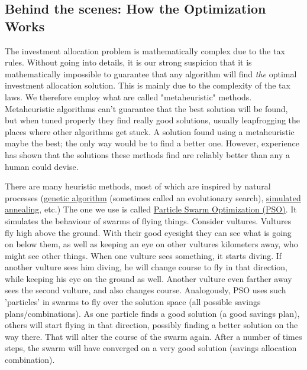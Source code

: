 \documentclass[a4paper, justified]{tufte-handout}
\begin{document}
\subsection{Behind  the scenes: How the Optimization Works}

The investment allocation problem is mathematically complex due to the tax rules. Without going into details, it is our strong suspicion that it is mathematically impossible to guarantee that any algorithm will find \textit{the} optimal investment allocation solution. This is mainly due to the complexity of the tax laws. We therefore employ what are called "metaheuristic" methods. Metaheuristic algorithms can't guarantee that the best solution will be found, but when tuned properly they find really good solutions, usually leapfrogging the places where other algorithms get stuck. A solution found using a metaheuristic maybe the best; the only way would be to find a better one. However, experience has shown that the solutions these methods find are reliably better than any a human could devise.

There are many heuristic methods, most of which are inspired by natural processes (\href{https://en.wikipedia.org/wiki/Genetic_algorithm}{genetic algorithm} (sometimes called an evolutionary search), \href{https://en.wikipedia.org/wiki/Simulated_annealing}{simulated annealing}, etc.) The one we use is called \href{https://en.wikipedia.org/wiki/Particle_swarm_optimization}{Particle Swarm Optimization (PSO)}. It simulates the behaviour of swarms of flying things. Consider vultures. Vultures fly high above the ground. With their good eyesight they can see what is going on below them, as well as keeping an eye on other vultures kilometers away, who might see other things. When one vulture sees something, it starts diving. If another vulture sees him diving, he will change course to fly in that direction, while keeping his eye on the ground as well. Another vulture even farther away sees the second vulture, and also changes course. Analogously, PSO uses such 'particles' in swarms to fly over the solution space (all possible savings plans/combinations). As one particle finds a good solution (a good savings plan), others will start flying in that direction, possibly finding a better solution on the way there. That will alter the course of the swarm again. After a number of times steps, the swarm will have converged on a very good solution (savings allocation combination).
\end{document}
